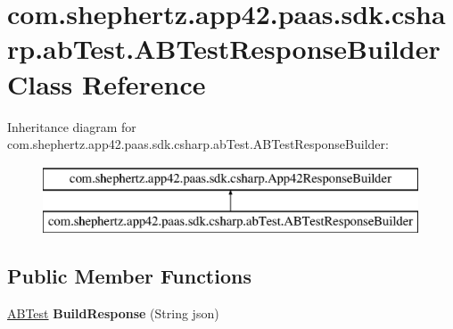 \hypertarget{classcom_1_1shephertz_1_1app42_1_1paas_1_1sdk_1_1csharp_1_1ab_test_1_1_a_b_test_response_builder}{\section{com.\+shephertz.\+app42.\+paas.\+sdk.\+csharp.\+ab\+Test.\+A\+B\+Test\+Response\+Builder Class Reference}
\label{classcom_1_1shephertz_1_1app42_1_1paas_1_1sdk_1_1csharp_1_1ab_test_1_1_a_b_test_response_builder}
}
Inheritance diagram for com.\+shephertz.\+app42.\+paas.\+sdk.\+csharp.\+ab\+Test.\+A\+B\+Test\+Response\+Builder\+:\begin{figure}[H]
\begin{center}
\leavevmode
\includegraphics[height=2.000000cm]{classcom_1_1shephertz_1_1app42_1_1paas_1_1sdk_1_1csharp_1_1ab_test_1_1_a_b_test_response_builder}
\end{center}
\end{figure}
\subsection*{Public Member Functions}
\begin{DoxyCompactItemize}
\item 
\hypertarget{classcom_1_1shephertz_1_1app42_1_1paas_1_1sdk_1_1csharp_1_1ab_test_1_1_a_b_test_response_builder_a4327494293a7d3b303fea3068c7f1223}{\hyperlink{classcom_1_1shephertz_1_1app42_1_1paas_1_1sdk_1_1csharp_1_1ab_test_1_1_a_b_test}{A\+B\+Test} {\bfseries Build\+Response} (String json)}\label{classcom_1_1shephertz_1_1app42_1_1paas_1_1sdk_1_1csharp_1_1ab_test_1_1_a_b_test_response_builder_a4327494293a7d3b303fea3068c7f1223}

\end{DoxyCompactItemize}

